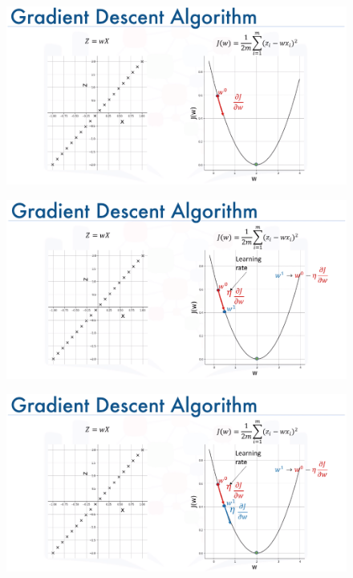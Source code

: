\documentclass[10pt, compress]{beamer}
\begin{document}
\begin{frame}
  \begin{figure}
    \includegraphics[width=1\linewidth]{imgs/edx_dl_keras/gd2}
  \end{figure}
\end{frame}

\begin{frame}
  \begin{figure}
    \includegraphics[width=1\linewidth]{imgs/edx_dl_keras/gd3}
  \end{figure}
\end{frame}

\begin{frame}
  \begin{figure}
    \includegraphics[width=1\linewidth]{imgs/edx_dl_keras/gd4}
  \end{figure}
\end{frame}
\end{document}
